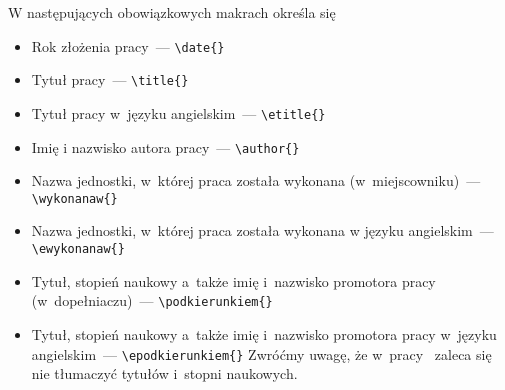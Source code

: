 \smallbreak
W następujących obowiązkowych makrach określa się
\begin{itemize}
 \item Rok złożenia pracy~--- \verb|\date{}|
 \item Tytuł pracy~--- \verb|\title{}|
 \item Tytuł pracy w~języku angielskim~--- \verb|\etitle{}|
 \item Imię i nazwisko autora pracy~--- \verb|\author{}|
 \item Nazwa jednostki, w~której praca została wykonana (w~miejscowniku)~--- \verb|\wykonanaw{}|
 \item Nazwa jednostki, w~której praca została wykonana w języku angielskim~--- \verb|\ewykonanaw{}|
 \item Tytuł, stopień naukowy a~także imię i~nazwisko promotora pracy (w~dopełniaczu)~--- \verb|\podkierunkiem{}|
 \item Tytuł, stopień naukowy a~także imię i~nazwisko promotora pracy w~języku angielskim~--- \verb|\epodkierunkiem{}| Zwróćmy uwagę, że w~pracy~\cite{Maslowski} zaleca się nie tłumaczyć tytułów i~stopni naukowych.
\end{itemize}


